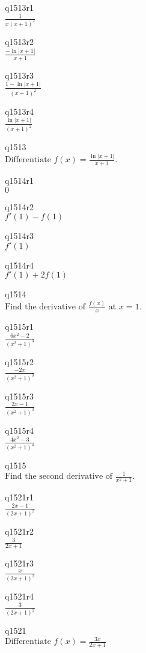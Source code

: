 q1513r1\\
\(\displaystyle \frac{1}{x(x+1)^2} \)

q1513r2\\
\(\displaystyle \frac{-\ln|x+1|}{x+1} \)

q1513r3\\
\(\displaystyle \frac{1-\ln|x+1|}{(x+1)^2} \)

q1513r4\\
\(\displaystyle \frac{\ln|x+1|}{(x+1)^2} \)

q1513\\
\(\displaystyle \text{Differentiate } f(x) = \frac{\ln|x+1|}{x+1}. \)

q1514r1\\
\(\displaystyle 0 \)

q1514r2\\
\(\displaystyle f'(1) - f(1) \)

q1514r3\\
\(\displaystyle f'(1) \)

q1514r4\\
\(\displaystyle f'(1) + 2f(1) \)

q1514\\
\(\displaystyle \text{Find the derivative of } \frac{f(x)}{x} \text{ at } x =1. \)

q1515r1\\
\(\displaystyle \frac{6x^2 - 2}{(x^2+1)^3} \)

q1515r2\\
\(\displaystyle \frac{-2x}{(x^2+1)^3} \)

q1515r3\\
\(\displaystyle \frac{2x-1}{(x^2+1)^3} \)

q1515r4\\
\(\displaystyle \frac{4x^2 - 3}{(x^2+1)^4} \)

q1515\\
\(\displaystyle \text{Find the second derivative of } \frac{1}{x^2+1}. \)

q1521r1\\
\(\displaystyle \frac{2x-1}{(2x+1)^2} \)

q1521r2\\
\(\displaystyle \frac{3}{2x+1} \)

q1521r3\\
\(\displaystyle \frac{x}{(2x+1)^2} \)

q1521r4\\
\(\displaystyle \frac{3}{(2x+1)^2} \)

q1521\\
\(\displaystyle \text{Differentiate } f(x) = \frac{3x}{2x+1} \)

